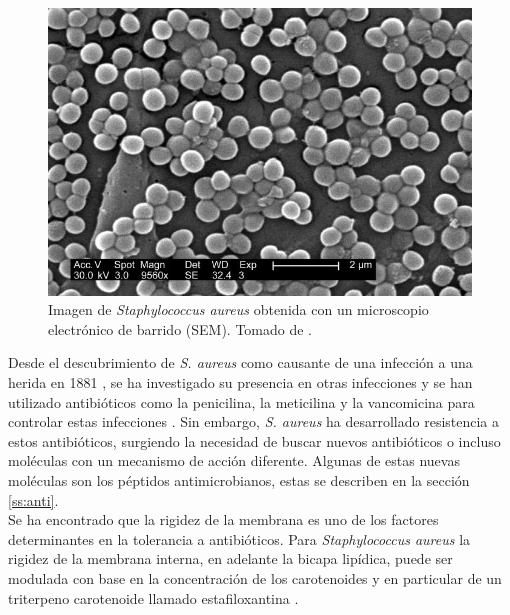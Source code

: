 \documentclass[12pt]{article}
\begin{document}
\begin{figure}[h]
\begin{center}
  \includegraphics[scale=0.3]{saureus.jpg}
  \caption{Imagen  de \textit{Staphylococcus aureus} obtenida con un microscopio electr\'onico de barrido (SEM). Tomado de \cite{HaneyCar2005PublicAureus}.}
  \label{fig:sta}
\end{center}
\end{figure}

Desde el descubrimiento de \textit{S. aureus} como causante de una infecci\'on a una herida en 1881 \cite{Orent2006AMagazine}, se ha investigado su presencia en otras infecciones y se han utilizado antibi\'oticos como la penicilina, la meticilina y la vancomicina para controlar estas infecciones   \cite{1HarpavatS.NissimS.LipppincottsMicrocards:MicrobiologyFlashCards2012.}. Sin embargo, \textit{S. aureus} ha desarrollado resistencia a estos antibi\'oticos,  surgiendo la necesidad de buscar nuevos antibi\'oticos o incluso moléculas con un mecanismo de acción diferente. Algunas de estas nuevas moléculas son los péptidos antimicrobianos, estas se describen en la sección \ref{ss:anti}.\\

Se ha encontrado que la rigidez de la membrana es uno de los factores determinantes en la tolerancia a antibióticos. Para \textit{Staphylococcus aureus} la rigidez de la membrana interna, en adelante la bicapa lipídica, puede ser modulada con base en la concentración de los carotenoides y en particular de un triterpeno carotenoide llamado estafiloxantina \cite{Nagendra2011}.\\
\end{document}
